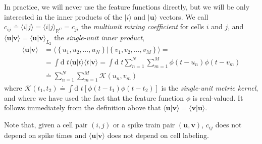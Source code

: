 \documentclass[11pt,a4paper]{article}
\newcommand{\dif}{\textrm{d }\!}
\newcommand{\ket}[1]{|#1\rangle}
\newcommand{\braket}[2]{\langle #1|#2 \rangle}
\newcommand{\bu}{\boldsymbol{u}}
\newcommand{\bv}{\boldsymbol{v}}
\begin{document}
In practice, we will never use the feature functions directly, but we
will be only interested in the inner products of the $\ket{i}$ and
$\ket{\bu}$ vectors. We call
$c_{ij}\doteq\braket{i}{j}=\braket{i}{j}_{\mathbb{R}^C}=c_{ji}$ the
\emph{multiunit mixing coefficient} for cells $i$ and $j$, and
$\braket{\bu}{\bv}=\braket{\bu}{\bv}_{L_2}$ the \emph{single-unit
  inner product},
\begin{equation}
  \label{eq:singleunit_intprod}
  \begin{split}
    \braket{\bu}{\bv} & = \braket{\left\{ u_1, u_2, \ldots,
        u_{N}\right\}}{\left\{ v_1, v_2, \ldots, v_{M}\right\}} = \\
    &= \int\dif t \braket{\bu}{t}\braket{t}{\bv} = \int\dif t
    \sum_{n=1}^N\sum_{m=1}^M\phi\left(t-u_n\right)\phi\left(t-v_m\right)\\
    &\doteq \sum_{n=1}^N\sum_{m=1}^M \mathcal{K}(u_n,v_m)
  \end{split}
\end{equation}
where $\mathcal{K}(t_1,t_2)\doteq\int\dif t
\left[\phi\left(t-t_1\right)\phi\left(t-t_2\right)\right]$ is the
\emph{single-unit metric kernel}, and where we have used the fact that
the feature function $\phi$ is real-valued. It follows immediately
from the definition above that $\braket{\bu}{\bv}=\braket{\bv}{\bu}$.

Note that, given a cell pair $(i,j)$ or a spike train pair
$(\bu,\bv)$, $c_{ij}$ does not depend on spike times and
$\braket{\bu}{\bv}$ does not depend on cell labeling. 
\end{document}

